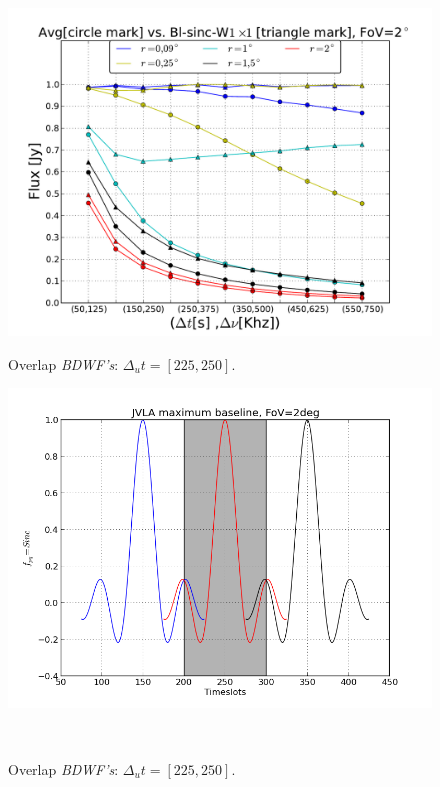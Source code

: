 \documentclass[useAMS,usenatbib]{mn2e}
\begin{document}
\begin{figure}
  \centering
\begin{minipage}{0.45\linewidth}\includegraphics[width=1\textwidth]{./Figures/max-integ-timefreq-sinc-w1x1fov2.pdf}\caption{Overlap 
		\textit{BDWF's}: $\Delta_u t= [225, 250]$.}\label{ fig:fig_3a}\end{minipage}
\begin{minipage}{0.38\linewidth}\includegraphics[width=1\textwidth]{./Figures/corrSigVLAMxBl_overlapLdelta.png}\caption{Overlap 
		\textit{BDWF's}: $\Delta_u t= [225, 250]$.}\label{ fig:fig_3a}\end{minipage}\\

\end{figure}
\end{document}
